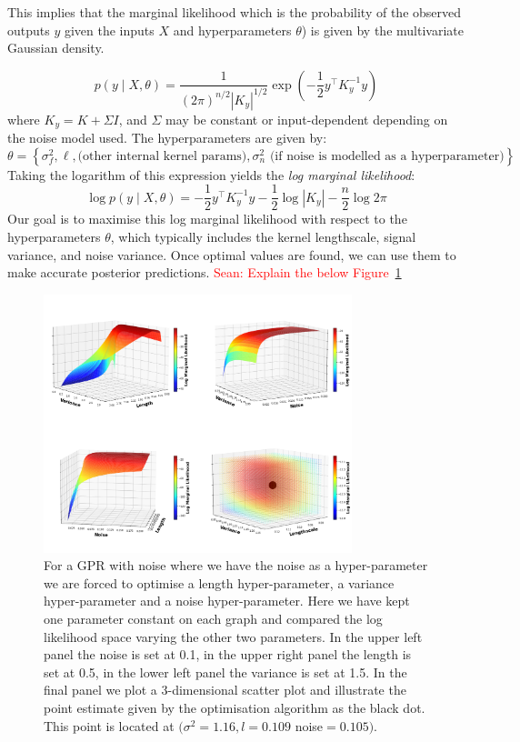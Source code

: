 \documentclass[12pt]{article}
\newcommand{\Sean}[1]{{\textcolor{red}{{Sean: #1}} }}
\begin{document}
\noindent
This implies that the marginal likelihood which is the probability of the observed outputs \( y \) given the inputs \( X \) and hyperparameters \( \theta \)) is given by the multivariate Gaussian density. 

\[
p(y \mid X, \theta) = \frac{1}{(2\pi)^{n/2} |K_y|^{1/2}} \exp\left( -\frac{1}{2} y^\top K_y^{-1} y \right)
\]
where \( K_y = K + \Sigma I \), and \( \Sigma \) may be constant or input-dependent depending on the noise model used.
\noindent
The hyperparameters are given by:
\[
\theta = \left\{ \sigma_f^2, \ell, \text{(other internal kernel params)}, \sigma_n^2 \,\, \text{(if noise is modelled as a hyperparameter)} \right\}.
\]
\noindent
Taking the logarithm of this expression yields the \textit{log marginal likelihood}:
\begin{equation}\label{eq: 5}
\log p(y \mid X, \theta) = -\frac{1}{2} y^\top K_y^{-1} y - \frac{1}{2} \log |K_y| - \frac{n}{2} \log 2\pi
\end{equation}
\noindent
Our goal is to maximise this log marginal likelihood with respect to the hyperparameters \( \theta \), which typically includes the kernel lengthscale, signal variance, and noise variance. Once optimal values are found, we can use them to make accurate posterior predictions.
\Sean{Explain the below Figure~\ref{figure: Optimising Hyper-params}}
\begin{figure}[H]
    \centering
    \includegraphics[width=0.8\textwidth]{LatexPlots/1dplots/LogLikeallparams.png}
    \caption{For a GPR with noise where we have the noise as a hyper-parameter we are forced to optimise a length hyper-parameter, a variance hyper-parameter and a noise hyper-parameter. 
    Here we have kept one parameter constant on each graph and compared the log likelihood space varying the other two parameters. 
    In the upper left panel the noise is set at 0.1, in the upper right panel the length is set at 0.5, in the lower left panel the variance is set at 1.5. 
    In the final panel we plot a 3-dimensional scatter plot and illustrate the point estimate given by the optimisation algorithm as the black dot. This point is located at
    $(\sigma^2 = 1.16, l = 0.109$ noise$ = 0.105)$.}
   \label{figure: Optimising Hyper-params}
\end{figure} 
\end{document}
